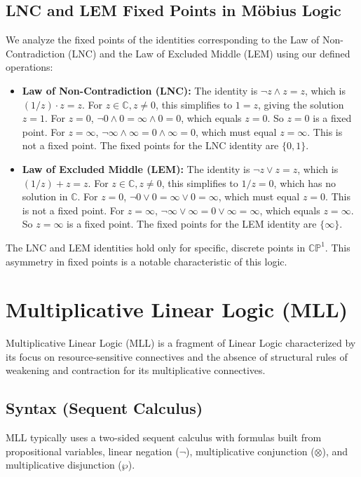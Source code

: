 \documentclass{article}
\begin{document}
	\subsection{LNC and LEM Fixed Points in Möbius Logic}
	We analyze the fixed points of the identities corresponding to the Law of Non-Contradiction (LNC) and the Law of Excluded Middle (LEM) using our defined operations:
	\begin{itemize}
		\item \textbf{Law of Non-Contradiction (LNC):} The identity is \(\neg z \wedge z = z\), which is \((1/z) \cdot z = z\).
		For \(z \in \mathbb{C}, z \neq 0\), this simplifies to \(1 = z\), giving the solution \(z=1\).
		For \(z=0\), \(\neg 0 \wedge 0 = \infty \wedge 0 = 0\), which equals \(z=0\). So \(z=0\) is a fixed point.
		For \(z=\infty\), \(\neg \infty \wedge \infty = 0 \wedge \infty = 0\), which must equal \(z=\infty\). This is not a fixed point.
		The fixed points for the LNC identity are \(\{0, 1\}\).
		\item \textbf{Law of Excluded Middle (LEM):} The identity is \(\neg z \vee z = z\), which is \((1/z) + z = z\).
		For \(z \in \mathbb{C}, z \neq 0\), this simplifies to \(1/z = 0\), which has no solution in \(\mathbb{C}\).
		For \(z=0\), \(\neg 0 \vee 0 = \infty \vee 0 = \infty\), which must equal \(z=0\). This is not a fixed point.
		For \(z=\infty\), \(\neg \infty \vee \infty = 0 \vee \infty = \infty\), which equals \(z=\infty\). So \(z=\infty\) is a fixed point.
		The fixed points for the LEM identity are \(\{\infty\}\).
	\end{itemize}
	The LNC and LEM identities hold only for specific, discrete points in \(\mathbb{CP}^1\). This asymmetry in fixed points is a notable characteristic of this logic.
	
	\section{Multiplicative Linear Logic (MLL)}
	
	Multiplicative Linear Logic (MLL) is a fragment of Linear Logic characterized by its focus on resource-sensitive connectives and the absence of structural rules of weakening and contraction for its multiplicative connectives.
	
	\subsection{Syntax (Sequent Calculus)}
	MLL typically uses a two-sided sequent calculus with formulas built from propositional variables, linear negation (\(\neg\)), multiplicative conjunction (\(\otimes\)), and multiplicative disjunction (\(\wp\)).
	
\end{document}
